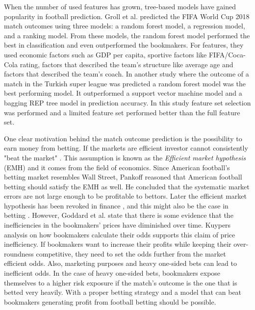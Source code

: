 When the number of used features has grown, tree-based models have gained popularity in football prediction. Groll et al.\cite{groll2018prediction} predicted the FIFA World Cup 2018 match outcomes using three models: a random forest model, a regression model, and a ranking model. From these models, the random forest model performed the best in classification and even outperformed the bookmakers. For features, they used economic factors such as GDP per capita, sportive factors like FIFA/Coca-Cola rating, factors that described the team's structure like average age and factors that described the team's coach. In another study where the outcome of a match in the Turkish super league was predicted a random forest model was the best performing model. It outperformed a support vector machine model and a bagging REP tree model in prediction accuracy. In this study feature set selection was performed and a limited feature set performed better than the full feature set. \cite{10.1007/978-3-319-29504-6_48}

One clear motivation behind the match outcome prediction is the possibility to earn money from betting. If the markets are efficient investor cannot consistently "beat the market" \cite{badarinathi1996football}. This assumption is known as the \textit{Efficient market hypothesis} (EMH) and it comes from the field of economics. Since American football's betting market resembles Wall Street, Pankoff \cite{pankoff1968market} reasoned that American football betting should satisfy the EMH as well. He concluded that the systematic market errors are not large enough to be profitable to bettors. Later the efficient market hypothesis has been revoked in finance \cite{jegadeesh1993returns}, and this might also be the case in betting \cite{goddard2003modelling, badarinathi1996football}. However, Goddard et al. \cite{goddard2003modelling} state that there is some evidence that the inefficiencies in the bookmakers’ prices have diminished over time. Kuypers \cite{kuypers2008} analysis on how bookmakers calculate their odds supports this claim of price inefficiency. If bookmakers want to increase their profits while keeping their over-roundness competitive, they need to set the odds further from the market efficient odds. Also, marketing purposes and heavy one-sided bets can lead to inefficient odds. In the case of heavy one-sided bets, bookmakers expose themselves to a higher risk exposure if the match's outcome is the one that is betted very heavily. With a proper betting strategy and a model that can beat bookmakers generating profit from football betting should be possible.

